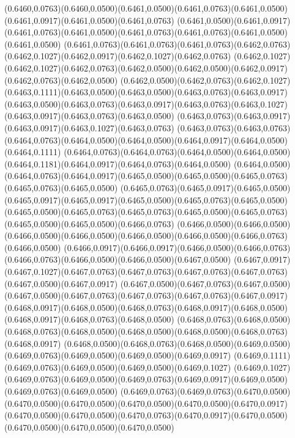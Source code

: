 (0.6460,0.0763)(0.6460,0.0500)(0.6461,0.0500)(0.6461,0.0763)(0.6461,0.0500)(0.6461,0.0917)(0.6461,0.0500)(0.6461,0.0763)
(0.6461,0.0500)(0.6461,0.0917)(0.6461,0.0763)(0.6461,0.0500)(0.6461,0.0763)(0.6461,0.0763)(0.6461,0.0500)(0.6461,0.0500)
(0.6461,0.0763)(0.6461,0.0763)(0.6461,0.0763)(0.6462,0.0763)(0.6462,0.1027)(0.6462,0.0917)(0.6462,0.1027)(0.6462,0.0763)
(0.6462,0.1027)(0.6462,0.1027)(0.6462,0.0763)(0.6462,0.0500)(0.6462,0.0500)(0.6462,0.0917)(0.6462,0.0763)(0.6462,0.0500)
(0.6462,0.0500)(0.6462,0.0763)(0.6462,0.1027)(0.6463,0.1111)(0.6463,0.0500)(0.6463,0.0500)(0.6463,0.0763)(0.6463,0.0917)
(0.6463,0.0500)(0.6463,0.0763)(0.6463,0.0917)(0.6463,0.0763)(0.6463,0.1027)(0.6463,0.0917)(0.6463,0.0763)(0.6463,0.0500)
(0.6463,0.0763)(0.6463,0.0917)(0.6463,0.0917)(0.6463,0.1027)(0.6463,0.0763)
\PST@Solid(0.6463,0.0763)(0.6463,0.0763)(0.6464,0.0763)(0.6464,0.0500)(0.6464,0.0500)(0.6464,0.0917)(0.6464,0.0500)(0.6464,0.1111)
(0.6464,0.0763)(0.6464,0.0763)(0.6464,0.0500)(0.6464,0.0500)(0.6464,0.1181)(0.6464,0.0917)(0.6464,0.0763)(0.6464,0.0500)
(0.6464,0.0500)(0.6464,0.0763)(0.6464,0.0917)(0.6465,0.0500)(0.6465,0.0500)(0.6465,0.0763)(0.6465,0.0763)(0.6465,0.0500)
(0.6465,0.0763)(0.6465,0.0917)(0.6465,0.0500)(0.6465,0.0917)(0.6465,0.0917)(0.6465,0.0500)(0.6465,0.0763)(0.6465,0.0500)
(0.6465,0.0500)(0.6465,0.0763)(0.6465,0.0763)(0.6465,0.0500)(0.6465,0.0763)(0.6465,0.0500)(0.6465,0.0500)(0.6466,0.0763)
(0.6466,0.0500)(0.6466,0.0500)(0.6466,0.0500)(0.6466,0.0500)(0.6466,0.0500)(0.6466,0.0500)(0.6466,0.0763)(0.6466,0.0500)
(0.6466,0.0917)(0.6466,0.0917)(0.6466,0.0500)(0.6466,0.0763)(0.6466,0.0763)(0.6466,0.0500)(0.6466,0.0500)(0.6467,0.0500)
(0.6467,0.0917)(0.6467,0.1027)(0.6467,0.0763)(0.6467,0.0763)(0.6467,0.0763)(0.6467,0.0763)(0.6467,0.0500)(0.6467,0.0917)
(0.6467,0.0500)(0.6467,0.0763)(0.6467,0.0500)(0.6467,0.0500)(0.6467,0.0763)(0.6467,0.0763)(0.6467,0.0763)(0.6467,0.0917)
(0.6468,0.0917)(0.6468,0.0500)(0.6468,0.0763)(0.6468,0.0917)(0.6468,0.0500)(0.6468,0.0917)(0.6468,0.0763)(0.6468,0.0500)
(0.6468,0.0763)(0.6468,0.0500)(0.6468,0.0763)(0.6468,0.0500)(0.6468,0.0500)(0.6468,0.0500)(0.6468,0.0763)(0.6468,0.0917)
(0.6468,0.0500)(0.6468,0.0763)(0.6468,0.0500)(0.6469,0.0500)(0.6469,0.0763)(0.6469,0.0500)(0.6469,0.0500)(0.6469,0.0917)
(0.6469,0.1111)(0.6469,0.0763)(0.6469,0.0500)(0.6469,0.0500)(0.6469,0.1027)
\PST@Solid(0.6469,0.1027)(0.6469,0.0763)(0.6469,0.0500)(0.6469,0.0763)(0.6469,0.0917)(0.6469,0.0500)(0.6469,0.0763)(0.6469,0.0500)
(0.6469,0.0763)(0.6469,0.0763)(0.6470,0.0500)(0.6470,0.0500)(0.6470,0.0500)(0.6470,0.0500)(0.6470,0.0500)(0.6470,0.0917)
(0.6470,0.0500)(0.6470,0.0500)(0.6470,0.0763)(0.6470,0.0917)(0.6470,0.0500)(0.6470,0.0500)(0.6470,0.0500)(0.6470,0.0500)
